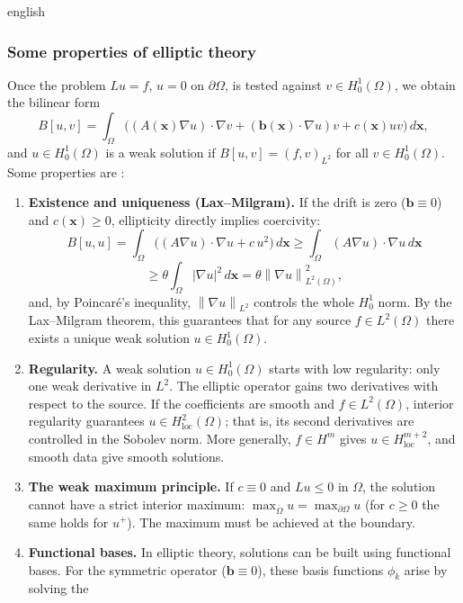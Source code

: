 \documentclass[11pt,letterpaper,twoside,openright]{book} %
\newcommand{\norm}[1]{\left\lVert #1 \right\rVert}
\newcommand{\abs}[1]{\left\lvert #1 \right\rvert}
\begin{document}
\begin{hyphenrules}{english}
\subsubsection{Some properties of elliptic theory}
Once the problem $Lu=f$, $u=0$ on $\partial\Omega$, is tested against $v\in H^1_0(\Omega)$, we obtain
the bilinear form
\begin{equation}
  B[u,v]=\int_\Omega\Big((A(\mathbf{x})\nabla u)\cdot\nabla v+(\mathbf{b}(\mathbf{x})\cdot\nabla u)v+c(\mathbf{x})uv\Big)\,d\mathbf{x},
  \label{eq:elliptic-bilinear}
\end{equation}
and $u\in H^1_0(\Omega)$ is a weak solution if $B[u,v]=(f,v)_{L^2}$ for all $v\in H^1_0(\Omega)$. Some
properties are \cite{evans2010}:
\begin{enumerate}
  \item \textbf{Existence and uniqueness (Lax--Milgram).} If the drift is zero ($\mathbf{b}\equiv0$) and
    $c(\mathbf{x})\ge0$, ellipticity directly implies coercivity:
    \[
      B[u,u]=\int_\Omega\big((A\nabla u)\cdot\nabla u+c\,u^2\big)\,d\mathbf{x}
      \ge\int_\Omega(A\nabla u)\cdot\nabla u\,d\mathbf{x}
    \]
    \[
      \ge\theta\int_\Omega\abs{\nabla u}^2\,d\mathbf{x}=\theta\norm{\nabla u}_{L^2(\Omega)}^2,
    \]
    and, by Poincaré's inequality, $\norm{\nabla u}_{L^2}$ controls the whole $H^1_0$ norm. By the
    Lax--Milgram theorem, this guarantees that for any source $f\in L^2(\Omega)$ there exists a unique
    weak solution $u\in H^1_0(\Omega)$.
  \item \textbf{Regularity.} A weak solution $u\in H^1_0(\Omega)$ starts with low regularity: only one
    weak derivative in $L^2$. The elliptic operator gains two derivatives with respect to the source. If
    the coefficients are smooth and $f\in L^2(\Omega)$, interior regularity guarantees
    $u\in H^2_{\mathrm{loc}}(\Omega)$; that is, its second derivatives are controlled in the Sobolev norm.
    More generally, $f\in H^m$ gives $u\in H^{m+2}_{\mathrm{loc}}$, and smooth data give smooth solutions.
  \item \textbf{The weak maximum principle.} If $c\equiv0$ and $Lu\le0$ in $\Omega$, the solution
    cannot have a strict interior maximum: $\max_{\bar\Omega}u=\max_{\partial\Omega}u$ (for $c\ge0$ the
    same holds for $u^+$). The maximum must be achieved at the boundary.
  \item \textbf{Functional bases.} In elliptic theory, solutions can be built using functional bases.
    For the symmetric operator ($\mathbf{b}\equiv0$), these basis functions $\phi_k$ arise by solving the

\end{enumerate}
\end{hyphenrules}
\end{document}
